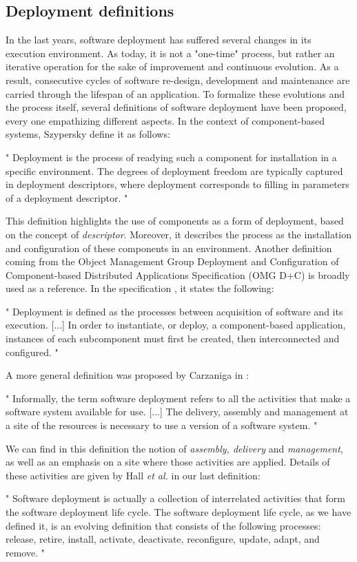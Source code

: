 \subsection{Deployment definitions}
In the last years, software deployment has suffered several changes in its execution environment.
As today, it is not a "one-time" process, but rather an iterative operation for the sake of improvement and continuous evolution.
As a result, consecutive cycles of software re-design, development and maintenance are carried through the lifespan of an application.
To formalize these evolutions and the process itself, several definitions of software deployment have been proposed, every one empathizing different aspects.
In the context of component-based systems, Szypersky\cite{szyperski2003component} define it as follows:
\begin{citeverbatim}
	" Deployment is the process of readying such a component for installation in a specific environment. 
	The degrees of deployment freedom are typically captured in deployment descriptors, where deployment corresponds to filling in parameters of a deployment descriptor. "
\end{citeverbatim}
This definition highlights the use of components as a form of deployment, based on the concept of \textit{descriptor}.
Moreover, it describes the process as the installation and configuration of these components in an environment.
Another definition coming from the Object Management Group Deployment and Configuration of Component-based Distributed Applications Specification (OMG D+C) is broadly used as a reference.
In the specification \cite{specification2006deployment}, it states the following:
\begin{citeverbatim}
	" Deployment is defined as the processes between acquisition of software and its execution. [...] In order to instantiate, or deploy, a component-based application, instances of each subcomponent must first be created, then interconnected and configured. "
\end{citeverbatim}
A more general definition was proposed by Carzaniga in \cite{carzaniga1997characterization}:
\begin{citeverbatim}
	" Informally, the term software deployment refers to all the activities that make a software system available for use. [...] The delivery, assembly and management at a site of the resources is necessary to use a version of a software system. "
\end{citeverbatim}
We can find in this definition the notion of \textit{assembly, delivery} and \textit{management}, as well as an emphasis on a site where those activities are applied.
Details of these activities are given by Hall \textit{et al.}\cite{hall1999cooperative} in our last definition:
\begin{citeverbatim}
	" Software deployment is actually a collection of interrelated activities that form the software deployment life cycle. 
	The software deployment life cycle, as we have defined it, is an evolving definition that consists of the following processes: release, retire, install, activate, deactivate, reconfigure, update, adapt, and remove. "
\end{citeverbatim}

